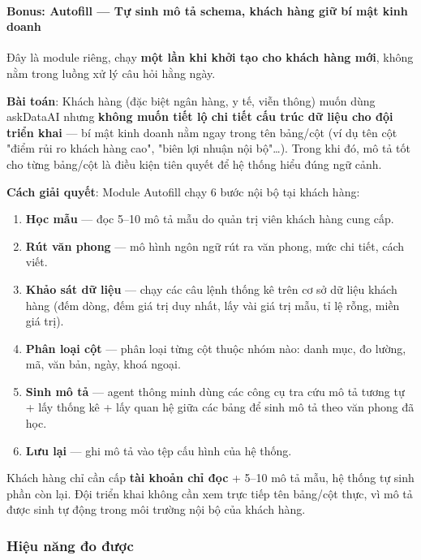 \documentclass[11pt,a4paper]{article}
\begin{document}
\paragraph{Bonus: Autofill --- Tự sinh mô tả schema, khách hàng giữ bí mật kinh doanh}

Đây là module riêng, chạy \textbf{một lần khi khởi tạo cho khách hàng mới}, không nằm trong luồng xử lý câu hỏi hằng ngày.

\begin{tcolorbox}[notebox]
\textbf{Bài toán}: Khách hàng (đặc biệt ngân hàng, y tế, viễn thông) muốn dùng askDataAI nhưng \textbf{không muốn tiết lộ chi tiết cấu trúc dữ liệu cho đội triển khai} --- bí mật kinh doanh nằm ngay trong tên bảng/cột (ví dụ tên cột "điểm rủi ro khách hàng cao", "biên lợi nhuận nội bộ"\ldots). Trong khi đó, mô tả tốt cho từng bảng/cột là điều kiện tiên quyết để hệ thống hiểu đúng ngữ cảnh.

\textbf{Cách giải quyết}: Module Autofill chạy 6 bước nội bộ tại khách hàng:
\begin{enumerate}
\item \textbf{Học mẫu} --- đọc 5--10 mô tả mẫu do quản trị viên khách hàng cung cấp.
\item \textbf{Rút văn phong} --- mô hình ngôn ngữ rút ra văn phong, mức chi tiết, cách viết.
\item \textbf{Khảo sát dữ liệu} --- chạy các câu lệnh thống kê trên cơ sở dữ liệu khách hàng (đếm dòng, đếm giá trị duy nhất, lấy vài giá trị mẫu, tỉ lệ rỗng, miền giá trị).
\item \textbf{Phân loại cột} --- phân loại từng cột thuộc nhóm nào: danh mục, đo lường, mã, văn bản, ngày, khoá ngoại.
\item \textbf{Sinh mô tả} --- agent thông minh dùng các công cụ tra cứu mô tả tương tự + lấy thống kê + lấy quan hệ giữa các bảng để sinh mô tả theo văn phong đã học.
\item \textbf{Lưu lại} --- ghi mô tả vào tệp cấu hình của hệ thống.
\end{enumerate}

Khách hàng chỉ cần cấp \textbf{tài khoản chỉ đọc} + 5--10 mô tả mẫu, hệ thống tự sinh phần còn lại. Đội triển khai không cần xem trực tiếp tên bảng/cột thực, vì mô tả được sinh tự động trong môi trường nội bộ của khách hàng.
\end{tcolorbox}

\subsubsection{Hiệu năng đo được}
\end{document}
